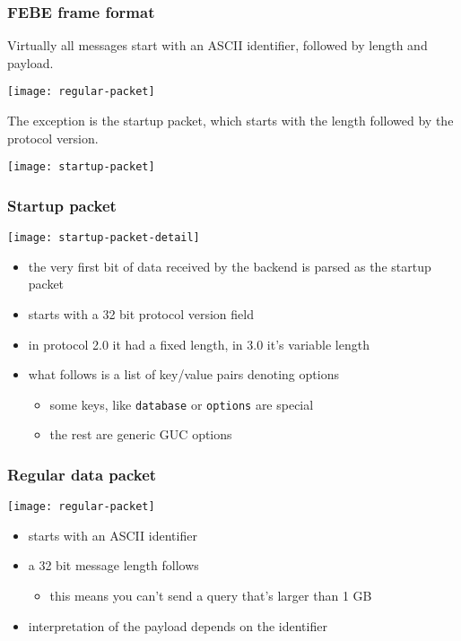 \documentclass{beamer}
\begin{document}
\begin{frame}
  \frametitle{FEBE frame format}

  Virtually all messages start with an ASCII identifier, followed by length and
  payload.

  \begin{center}
    \texttt{[image: regular-packet]}
  \end{center}

  The exception is the startup packet, which starts with the length followed by
  the protocol version.

  \begin{center}
    \texttt{[image: startup-packet]}
  \end{center}

\end{frame}

\begin{frame}
  \frametitle{Startup packet}

  \begin{center}
    \texttt{[image: startup-packet-detail]}
  \end{center}

  \begin{itemize}
  \item the very first bit of data received by the backend is parsed as the
    startup packet
  \item starts with a 32 bit protocol version field
  \item in protocol 2.0 it had a fixed length, in 3.0 it's variable length
  \item what follows is a list of key/value pairs denoting options
    \begin{itemize}
    \item some keys, like \texttt{database} or \texttt{options} are special
    \item the rest are generic GUC options
    \end{itemize}
  \end{itemize}
\end{frame}

\begin{frame}
  \frametitle{Regular data packet}

  \begin{center}
    \texttt{[image: regular-packet]}
  \end{center}

  \begin{itemize}
  \item starts with an ASCII identifier
  \item a 32 bit message length follows
    \begin{itemize}
    \item this means you can't send a query that's larger than 1 GB
    \end{itemize}
  \item interpretation of the payload depends on the identifier
  \end{itemize}
\end{frame}
\end{document}
